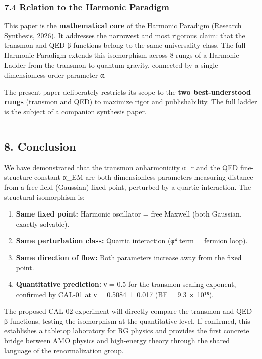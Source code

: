 \documentclass[
]{article}
\providecommand{\tightlist}{%
  \setlength{\itemsep}{0pt}\setlength{\parskip}{0pt}}
\begin{document}
\subsubsection{7.4 Relation to the Harmonic
Paradigm}\label{relation-to-the-harmonic-paradigm}

This paper is the \textbf{mathematical core} of the Harmonic Paradigm
(Research Synthesis, 2026). It addresses the narrowest and most rigorous
claim: that the transmon and QED β-functions belong to the same
universality class. The full Harmonic Paradigm extends this isomorphism
across 8 rungs of a Harmonic Ladder from the transmon to quantum
gravity, connected by a single dimensionless order parameter α.

The present paper deliberately restricts its scope to the \textbf{two
best-understood rungs} (transmon and QED) to maximize rigor and
publishability. The full ladder is the subject of a companion synthesis
paper.

\begin{center}\rule{0.5\linewidth}{0.5pt}\end{center}

\subsection{8. Conclusion}\label{conclusion}

We have demonstrated that the transmon anharmonicity α\_r and the QED
fine-structure constant α\_EM are both dimensionless parameters
measuring distance from a free-field (Gaussian) fixed point, perturbed
by a quartic interaction. The structural isomorphism is:

\begin{enumerate}
\def\labelenumi{\arabic{enumi}.}
\tightlist
\item
  \textbf{Same fixed point:} Harmonic oscillator = free Maxwell (both
  Gaussian, exactly solvable).
\item
  \textbf{Same perturbation class:} Quartic interaction (φ⁴ term =
  fermion loop).
\item
  \textbf{Same direction of flow:} Both parameters increase away from
  the fixed point.
\item
  \textbf{Quantitative prediction:} ν = 0.5 for the transmon scaling
  exponent, confirmed by CAL-01 at ν = 0.5084 ± 0.017 (BF = 9.3 × 10¹⁸).
\end{enumerate}

The proposed CAL-02 experiment will directly compare the transmon and
QED β-functions, testing the isomorphism at the quantitative level. If
confirmed, this establishes a tabletop laboratory for RG physics and
provides the first concrete bridge between AMO physics and high-energy
theory through the shared language of the renormalization group.
\end{document}
